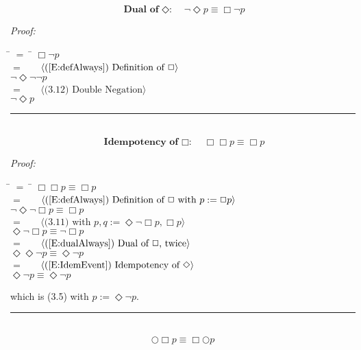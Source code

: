 \documentclass[fleqn, leqno]{article}
\newcommand{\lgap}{2pt}                             %
\newcommand{\mymathindent}{24pt}                      %
\newcommand{\next}{\bigcirc}
\newcommand{\event}{\Diamond}
\newcommand{\always}{\Box}
\newcommand{\myqed}{\hfill\rule[-.23ex]{1.2ex}{2.0ex}}
\newcommand{\Gll} {\langle}                         %
\newcommand{\Ggg} {\rangle}                         %
\newcommand{\Hint}[1]     {\ \ \ $\Gll              \mbox{#1} \Ggg$ }   %
\begin{document}
\begin{equation}\label{E:dualEvent}
\textbf{Dual of $\event$:}\quad \lnot\event p \equiv \always\lnot p
\end{equation}

\emph{Proof:}
\begin{tabbing}
\hspace{\mymathindent} \= $= \;$ \= \kill
  \> \>   $\always\lnot p$\\[\lgap]
  \> $=$  \>  \Hint{(\ref{E:defAlways}) Definition of $\always$}\\[\lgap]
  \> \>   $\lnot\event\lnot\lnot p$\\[\lgap]
  \> $=$  \>  \Hint{(3.12) Double Negation}\\[\lgap]
  \> \>   $\lnot\event p$\\[\lgap]
\end{tabbing}
\myqed\\[\lgap]


\begin{equation}\label{E:IdemAlways}
\textbf{Idempotency of $\always$:}\quad \always\always p \equiv \always p
\end{equation}

\emph{Proof:}
\begin{tabbing}
\hspace{\mymathindent} \= $= \;$ \= \kill
  \> \>   $\always\always p \equiv \always p$\\[\lgap]
  \> $=$  \>  \Hint{(\ref{E:defAlways}) Definition of $\always$ with $p := \always p$}\\[\lgap]
  \> \>   $\lnot\event\lnot\always p \equiv \always p$\\[\lgap]
  \> $=$  \>  \Hint{(3.11) with $p,q := \event\lnot\always p, \always p$}\\[\lgap]
  \> \>   $\event\lnot\always p \equiv \lnot\always p$\\[\lgap]
  \> $=$  \>  \Hint{(\ref{E:dualAlways}) Dual of $\always$, twice}\\[\lgap]
  \> \>   $\event\event\lnot p \equiv \event\lnot p$\\[\lgap]
  \> $=$  \>  \Hint{(\ref{E:IdemEvent}) Idempotency of $\event$}\\[\lgap]
  \> \>   $\event\lnot p \equiv \event\lnot p$\\[\lgap]
\end{tabbing}
which is (3.5) with $p := \event\lnot p$. \myqed\\[\lgap]


\begin{equation}\label{E:dNextAlways}
\next\always p \equiv \always\next p
\end{equation}
\end{document}
